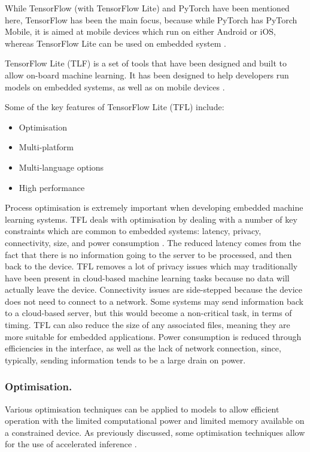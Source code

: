 \documentclass{svproc}
\begin{document}
While TensorFlow (with TensorFlow Lite) and PyTorch have been mentioned here, TensorFlow has been the main focus, because while PyTorch has 
PyTorch Mobile, it is aimed at mobile devices which run on either Android or iOS, whereas TensorFlow Lite can be used on embedded system \cite{b9} \cite{b12}.

TensorFlow Lite (TLF) is a set of tools that have been designed and built to allow on-board machine learning. It has been designed to help 
developers run models on embedded systems, as well as on mobile devices \cite{b12}.

Some of the key features of TensorFlow Lite (TFL) include:

\begin{itemize}
    \item Optimisation
    \item Multi-platform
    \item Multi-language options
    \item High performance
\end{itemize}

Process optimisation is extremely important when developing embedded machine learning systems. TFL deals with optimisation by dealing with a number 
of key constraints which are common to embedded systems: latency, privacy, connectivity, size, and power consumption \cite{b7}. The reduced latency 
comes from the fact that there is no information going to the server to be processed, and then back to the device. TFL removes a lot of privacy 
issues which may traditionally have been present in cloud-based machine learning tasks because no data will actually leave the device. 
Connectivity issues are side-stepped because the device does not need to connect to a network. Some systems may send information back to a cloud-based 
server, but this would become a non-critical task, in terms of timing. TFL can also reduce the size of any associated files, meaning they are more 
suitable for embedded applications. Power consumption is reduced through efficiencies in the interface, as well as the lack of network connection, 
since, typically, sending information tends to be a large drain on power.

\subsubsection{Optimisation.} Various optimisation techniques can be applied to models to allow efficient operation with the limited computational 
power and limited memory available on a constrained device. As previously discussed, some optimisation techniques allow for the use 
of accelerated inference \cite{b13}.
\end{document}
